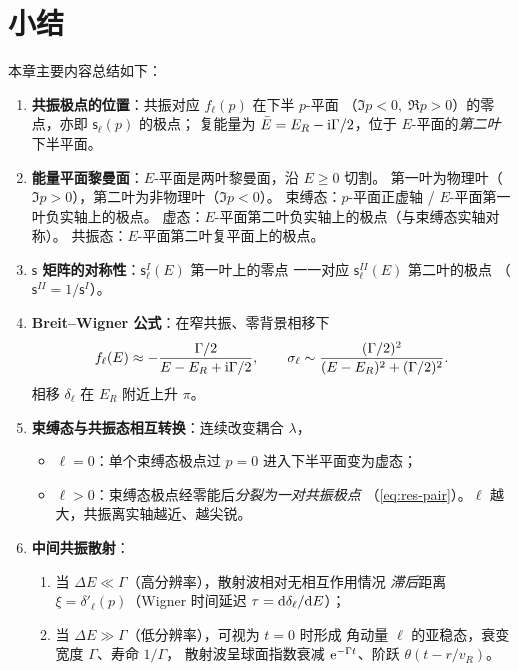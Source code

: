 \section{小结}

本章主要内容总结如下：
\begin{enumerate}
  \item \textbf{共振极点的位置}：共振对应 $f_\ell(p)$ 在下半 $p$-平面
    （$\Im p<0,\;\Re p>0$）的零点，亦即 $\mathsf{s}_\ell(p)$ 的极点；
    复能量为 $\bar E=E_R-\mathrm{i}\Gamma/2$，位于 $E$-平面的\emph{第二叶}下半平面。
  \item \textbf{能量平面黎曼面}：$E$-平面是两叶黎曼面，沿 $E\geq 0$ 切割。
    第一叶为物理叶（$\Im p>0$），第二叶为非物理叶（$\Im p<0$）。
    束缚态：$p$-平面正虚轴 / $E$-平面第一叶负实轴上的极点。
    虚态：$E$-平面第二叶负实轴上的极点（与束缚态实轴对称）。
    共振态：$E$-平面第二叶复平面上的极点。
  \item \textbf{$\mathsf{s}$ 矩阵的对称性}：$\mathsf{s}_\ell^I(E)$ 第一叶上的零点
    一一对应 $\mathsf{s}_\ell^{II}(E)$ 第二叶的极点
    （$\mathsf{s}^{II}=1/\mathsf{s}^I$）。
  \item \textbf{Breit--Wigner 公式}：在窄共振、零背景相移下
    \begin{equation*}
      f_\ell(E)\approx -\frac{\Gamma/2}{E-E_R+\mathrm{i}\Gamma/2},\qquad
      \sigma_\ell\sim\frac{(\Gamma/2)^2}{(E-E_R)^2+(\Gamma/2)^2}.
    \end{equation*}
    相移 $\delta_\ell$ 在 $E_R$ 附近上升 $\pi$。
  \item \textbf{束缚态与共振态相互转换}：连续改变耦合 $\lambda$，
    \begin{itemize}
      \item $\ell=0$：单个束缚态极点过 $p=0$ 进入下半平面变为虚态；
      \item $\ell>0$：束缚态极点经零能后\emph{分裂为一对共振极点}
        （\eqref{eq:res-pair}）。$\ell$ 越大，共振离实轴越近、越尖锐。
    \end{itemize}
  \item \textbf{中间共振散射}：
    \begin{enumerate}
      \item 当 $\Delta E\ll \Gamma$（高分辨率），散射波相对无相互作用情况
        \emph{滞后}距离 $\xi=\delta'_\ell(p)$（Wigner 时间延迟
        $\tau=\mathrm{d}\delta_\ell/\mathrm{d} E$）；
      \item 当 $\Delta E\gg \Gamma$（低分辨率），可视为 $t=0$ 时形成
        角动量 $\ell$ 的亚稳态，衰变宽度 $\Gamma$、寿命 $1/\Gamma$，
        散射波呈球面指数衰减 $\mathrm{e}^{-\Gamma t}$、阶跃 $\theta(t-r/v_R)$。
    \end{enumerate}
\end{enumerate}

